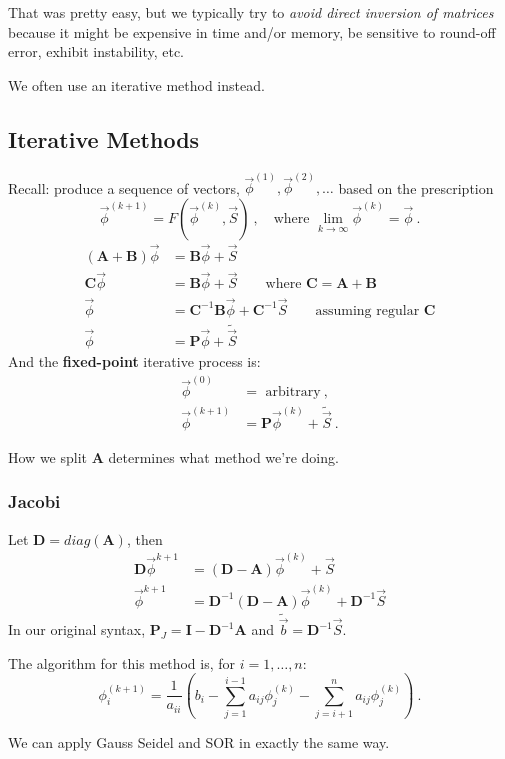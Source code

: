 \documentclass[12pt]{article}
\newcommand{\ve}[1]{\ensuremath{\mathbf{#1}}}
\begin{document}
That was pretty easy, but we typically try to \textit{avoid direct inversion of matrices} because it might be expensive in time and/or memory, be sensitive to round-off error, exhibit instability, etc.

We often use an iterative method instead. 


\subsection*{Iterative Methods}

Recall: produce a sequence of vectors, $\vec{\phi}^{(1)}, \vec{\phi}^{(2)}, \dots$ based on the prescription
  \[\vec{\phi}^{(k+1)} = F(\vec{\phi}^{(k)}, \vec{S})\:, \quad \text{where } \displaystyle \lim_{k \rightarrow \infty} \vec{\phi}^{(k)} = \vec{\phi}\:.\] 
%
\begin{align}
(\ve{A} + \ve{B}) \vec{\phi} &= \ve{B}\vec{\phi} + \vec{S} \nonumber \\
%
\ve{C} \vec{\phi} &= \ve{B}\vec{\phi} + \vec{S} 
\qquad\text{where } \ve{C} = \ve{A} + \ve{B} \nonumber \\
%
\vec{\phi} &= \ve{C}^{-1} \ve{B}\vec{\phi} + \ve{C}^{-1} \vec{S} 
\qquad\text{assuming regular } \ve{C}
\nonumber \\
%
\vec{\phi} &= \ve{P}\vec{\phi} + \tilde{\vec{S}}  
\nonumber
\end{align}
%
And the \textbf{fixed-point} iterative process is:
\begin{align}
\vec{\phi}^{(0)} &= \text{ arbitrary}\:,\nonumber \\
\vec{\phi}^{(k+1)} &= \ve{P}\vec{\phi}^{(k)} + \tilde{\vec{S}}\:. \nonumber
\end{align}

How we split $\ve{A}$ determines what method we're doing.

\subsubsection*{Jacobi}

Let $\ve{D} = diag(\ve{A})$, then
\begin{align}
\ve{D} \vec{\phi}^{k+1} &= (\ve{D} - \ve{A})\vec{\phi}^{(k)} + \vec{S} \nonumber \\
%
\vec{\phi}^{k+1} &= \ve{D}^{-1}(\ve{D} - \ve{A})\vec{\phi}^{(k)} + \ve{D}^{-1}\vec{S} \nonumber
\end{align}
%
In our original syntax, $\ve{P}_J = \ve{I} -  \ve{D}^{-1}\ve{A}$ and $\tilde{\vec{b}} =\ve{D}^{-1}\vec{S}$.

The algorithm for this method is, for $i = 1, \dots, n$:
\[ \phi^{(k+1)}_i = \frac{1}{a_{ii}}(b_i - \sum_{j=1}^{i-1} a_{ij} \phi_j^{(k)} - \sum_{j=i+1}^{n} a_{ij} \phi_j^{(k)})\:.\]

We can apply Gauss Seidel and SOR in exactly the same way. 




%
% 
\end{document}
